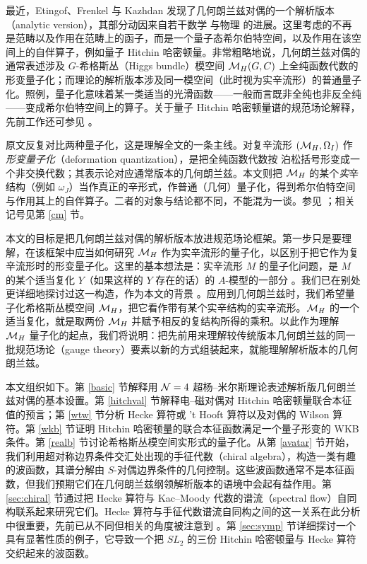 最近，Etingof、Frenkel 与 Kazhdan \cite{EFK,EFK2,EFK3} 发现了几何朗兰兹对偶的一个解析版本（analytic version），其部分动因来自若干数学 \cite{L} 与物理 \cite{T} 的进展。这里考虑的不再是范畴以及作用在范畴上的函子，而是一个量子态希尔伯特空间，以及作用在该空间上的自伴算子，例如量子 Hitchin 哈密顿量。非常粗略地说，几何朗兰兹对偶的通常表述涉及 $G$-希格斯丛（Higgs bundle）模空间 ${\mathcal M}_H(G,C)$ 上全纯函数代数的形变量子化；而理论的解析版本涉及同一模空间（此时视为实辛流形）的普通量子化。照例，量子化意味着某一类适当的光滑函数——一般而言既非全纯也非反全纯——变成希尔伯特空间上的算子。关于量子 Hitchin 哈密顿量谱的规范场论解释，先前工作还可参见 \cite{Teschner:2010je,Balasubramanian:2017gxc,Nekrasov:2010ka,Nekrasov:2009rc,Nekrasov:2011bc,Nekrasov:2014yra,Jeong:2018qpc,Bonelli:2011na}。

\begin{yizhu}
原文反复对比两种量子化，这是理解全文的一条主线。对复辛流形 $({\mathcal M}_H,\Omega_I)$ 作\emph{形变量子化}（deformation quantization），是把全纯函数代数按 泊松括号形变成一个非交换代数；其表示论对应通常版本的几何朗兰兹。本文则把 ${\mathcal M}_H$ 的某个\emph{实}辛结构（例如 $\omega_J$）当作真正的辛形式，作普通（几何）量子化，得到希尔伯特空间与作用其上的自伴算子。二者的对象与结论都不同，不能混为一谈。参见 \cite{GuW}；相关记号见第 \ref{cm} 节。
\end{yizhu}

本文的目标是把几何朗兰兹对偶的解析版本放进规范场论框架。第一步只是要理解，在该框架中应当如何研究 ${\mathcal M}_H$ 作为实辛流形的量子化，以区别于把它作为复辛流形时的形变量子化。这里的基本想法是：实辛流形 $M$ 的量子化问题，是 $M$ 的某个适当复化 $Y$（如果这样的 $Y$ 存在的话）的 $A$-模型的一部分 \cite{GuW}。我们已在别处更详细地探讨过这一构造，作为本文的背景 \cite{GW}。应用到几何朗兰兹时，我们希望量子化希格斯丛模空间 ${\mathcal M}_H$，把它看作带有某个实辛结构的实辛流形。${\mathcal M}_H$ 的一个适当复化，就是取两份 ${\mathcal M}_H$ 并赋予相反的复结构所得的乘积。以此作为理解 ${\mathcal M}_H$ 量子化的起点，我们将说明：把先前用来理解较传统版本几何朗兰兹的同一批规范场论（gauge theory）要素以新的方式组装起来，就能理解解析版本的几何朗兰兹。

本文组织如下。第 \ref{basic} 节解释用 ${\mathcal N}=4$ 超杨–米尔斯理论表述解析版几何朗兰兹对偶的基本设置。第 \ref{hitchval} 节解释电–磁对偶对 Hitchin 哈密顿量联合本征值的预言；第 \ref{wtw} 节分析 Hecke 算符或 't Hooft 算符以及对偶的 Wilson 算符。第 \ref{wkb} 节证明 Hitchin 哈密顿量的联合本征函数满足一个量子形变的 WKB 条件。第 \ref{realb} 节讨论希格斯丛模空间实形式的量子化。从第 \ref{avatar} 节开始，我们利用超对称边界条件交汇处出现的手征代数（chiral algebra），构造一类有趣的波函数，其谱分解由 $S$-对偶边界条件的几何控制。这些波函数通常不是本征函数，但我们预期它们在几何朗兰兹纲领解析版本的语境中会起有益作用。第 \ref{sec:chiral} 节通过把 Hecke 算符与 Kac--Moody 代数的谱流（spectral flow）自同构联系起来研究它们。Hecke 算符与手征代数谱流自同构之间的这一关系在此分析中很重要，先前已从不同但相关的角度被注意到 \cite{Teschner:2010je}。第 \ref{sec:symp} 节详细探讨一个具有显著性质的例子，它导致一个把 $SL_2$ 的三份 Hitchin 哈密顿量与 Hecke 算符交织起来的波函数。

